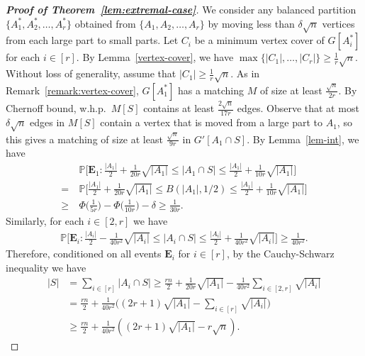 \documentclass[11pt, a4paper]{article}
\theoremstyle{definition}
\newcommand{\<}{\subseteq}
\newcommand{\de}{\delta}
\begin{document}
\begin{proof}[{\bf Proof of Theorem~\ref{lem:extremal-case}}]
We consider any balanced partition $\{A_1^*,A_2^*,\ldots,A_r^*\}$ obtained from $\{A_1,A_2,\ldots,A_r\}$ by moving less than $\de \sqrt{n}$ vertices from each large part to small parts. Let $C_i$ be a minimum vertex cover of $G[A_i^*]$ for each $i\in [r]$. By Lemma~\ref{vertex-cover}, we have $\max\{|C_1|,\ldots,|C_r|\}\geq \frac{1}{r}\sqrt{n}$. Without loss of generality, assume that $|C_1|\geq \frac{1}{r}\sqrt{n}$. 
As in Remark~\ref{remark:vertex-cover}, $G[A_1^*]$ has a matching $M$ of size at least $\frac{\sqrt{n}}{2r}$. By Chernoff bound, w.h.p.~$M[S]$ contains at least $\frac{2\sqrt{n}}{17r}$ edges. Observe that at most $\de \sqrt{n}$ edges in $M[S]$ contain a {vertex that is moved from a large part to $A_1$}, so this gives a matching of size at least $\frac{\sqrt{n}}{9r}$ in ${G'}[A_1\cap S]$. By Lemma~\ref{lem-int}, %
we have 
\begin{align*}\label{eq:the size of A1}
&\ \mathbb{P}\Big[\mathbf{E}_1:\frac{|A_1|}{2}+ \frac{1}{20r}\sqrt{{|A_1|}}\leq |A_1\cap S|\leq \frac{|A_1|}{2}+\frac{1}{10r}\sqrt{{|A_1|}}\Big]\\
=&\ \mathbb{P}\Big[\frac{|A_1|}{2}+\frac{1}{20r}\sqrt{{|A_1|}}\leq B(|A_1|,1/2)\leq \frac{|A_1|}{2}+\frac{1}{10r}\sqrt{{|A_1|}}\Big]\\
\geq&\  \Phi\Big(\frac{1}{5r}\Big)-\Phi\Big(\frac{1}{10r}\Big)-\de\geq \frac{1}{30r}.
\end{align*}
Similarly, for each $i\in [2,r]$ we 
have 
\begin{align*}
\mathbb{P}\Big[\mathbf{E}_i:\frac{|A_i|}{2}-\frac{1}{40r^2}\sqrt{{|A_i|}}\leq |A_i\cap S|\leq \frac{|A_i|}{2}+\frac{1}{40r^2}\sqrt{{|A_i|}}\Big]\geq \frac{1}{40r^2}.
\end{align*}
Therefore, conditioned on all events $\mathbf{E}_i$ for $i\in [r]$, by the Cauchy-Schwarz inequality we have  
\begin{align*}
|S|&=\sum_{i\in [r]}|A_i\cap S|\ge \frac{rn}{2}+\frac{1}{20r}\sqrt{{|A_1|}}-\frac{1}{40r^2}\sum_{i\in [2,r]}\sqrt{|A_i|}\\
&= \frac{rn}{2}+\frac{1}{40r^2}\Big((2r+1)\sqrt{|A_1|}-\sum_{i\in [r]}\sqrt{|A_i|}\Big)\\
&\ge \frac{rn}{2}+\frac{1}{40r^2}\left((2r+1)\sqrt{|A_1|}-r\sqrt{n}\right).
\end{align*}

\end{proof}
\end{document}

